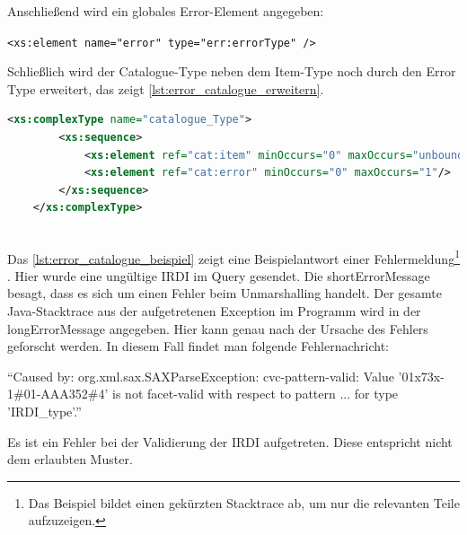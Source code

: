 Anschließend wird ein globales Error-Element angegeben:

\lstinline[basicstyle=\ttfamily\small\mdseries]{<xs:element name="error" type="err:errorType" />}

Schließlich wird der Catalogue-Type neben dem Item-Type noch durch den Error Type erweitert, das zeigt \autoref{lst:error_catalogue_erweitern}.

 \begin{lstlisting}[caption=Fehlerbehandlung - Catalogue Type erweitern, language=xml, label=lst:error_catalogue_erweitern]
	<xs:complexType name="catalogue_Type">
		<xs:sequence>
			<xs:element ref="cat:item" minOccurs="0" maxOccurs="unbounded"/>
			<xs:element ref="cat:error" minOccurs="0" maxOccurs="1"/>
		</xs:sequence>
	</xs:complexType> 
	
\end{lstlisting} 

Das \autoref{lst:error_catalogue_beispiel} zeigt eine Beispielantwort einer Fehlermeldung\footnote{Das Beispiel bildet einen gekürzten Stacktrace ab, um nur die relevanten Teile aufzuzeigen.} . Hier wurde eine ungültige IRDI im Query gesendet. Die shortErrorMessage besagt, dass es sich um einen Fehler beim Unmarshalling handelt. Der gesamte Java-Stacktrace aus der aufgetretenen Exception im Programm wird in der longErrorMessage angegeben. Hier kann genau nach der Ursache des Fehlers geforscht werden. In diesem Fall findet man folgende Fehlernachricht:

\enquote{Caused by: org.xml.sax.SAXParseException: cvc-pattern-valid: Value '01x73x-1\#01-AAA352\#4' is not facet-valid with respect to pattern ... for type 'IRDI\_type'.}

Es ist ein Fehler bei der Validierung der IRDI aufgetreten. Diese entspricht nicht dem erlaubten Muster.


